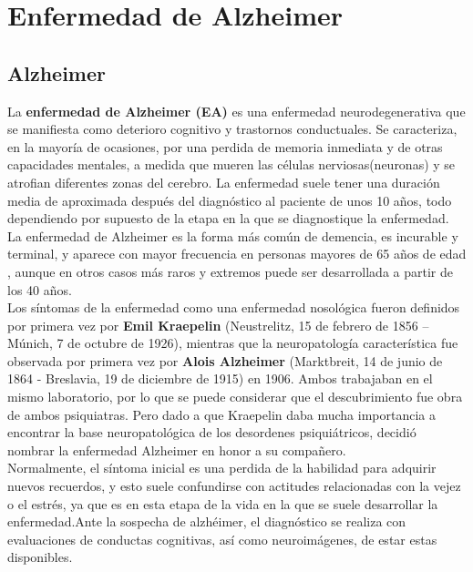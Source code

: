 \chapter{Enfermedad de Alzheimer}

\section{Alzheimer}

La \textbf{enfermedad de Alzheimer (EA)}  es una enfermedad neurodegenerativa que se manifiesta como deterioro cognitivo y trastornos conductuales. Se caracteriza, en la mayoría de ocasiones,  por una perdida de memoria inmediata  y de otras capacidades mentales, a medida que mueren las células nerviosas(neuronas) y se atrofian diferentes zonas del cerebro. La enfermedad suele tener una duración media de aproximada después del diagnóstico al paciente de unos 10 años, todo dependiendo por supuesto de la etapa en la que se diagnostique la enfermedad.
\\
La enfermedad de Alzheimer es la forma más común de demencia, es incurable y terminal, y aparece con mayor frecuencia en personas mayores de 65 años de edad \cite{3}, aunque en otros casos más raros y extremos puede ser desarrollada a partir de los 40 años. 
\\
Los síntomas de la enfermedad como una enfermedad nosológica fueron definidos por primera vez por \textbf{Emil Kraepelin} (Neustrelitz, 15 de febrero de 1856 – Múnich, 7 de octubre de 1926), mientras que la neuropatología característica fue observada por primera vez por \textbf{Alois Alzheimer} (Marktbreit, 14 de junio de 1864 - Breslavia, 19 de diciembre de 1915) en 1906. Ambos trabajaban en el mismo laboratorio, por lo que se puede considerar que el descubrimiento fue obra de ambos psiquiatras. Pero dado a que Kraepelin daba mucha importancia a encontrar la base neuropatológica de los desordenes psiquiátricos, decidió nombrar la enfermedad Alzheimer en honor a su compañero.
\\

Normalmente, el síntoma inicial es una perdida de la habilidad para adquirir nuevos recuerdos, y esto suele confundirse con actitudes relacionadas con la vejez o el estrés, ya que es en esta etapa de la vida en la que se suele desarrollar la enfermedad.Ante la sospecha de alzhéimer, el diagnóstico se realiza con evaluaciones de conductas cognitivas, así como neuroimágenes, de estar estas disponibles.
\\

